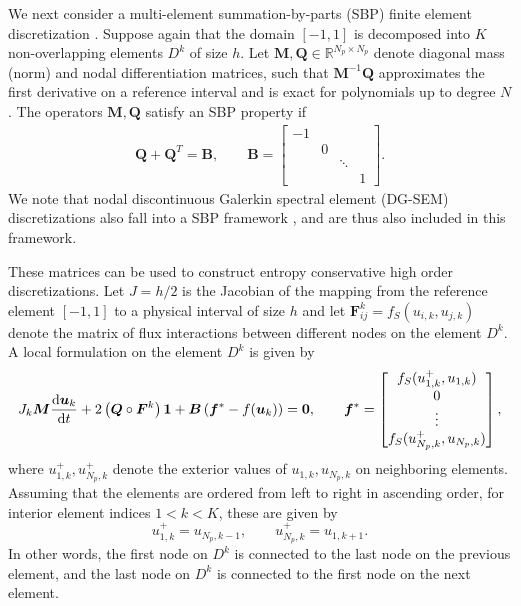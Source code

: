 \documentclass{article}
\newcommand{\td}[2]{\frac{{\rm d}#1}{{\rm d}{ {#2}}}}
\newcommand{\LRp}[1]{\left( #1 \right)}
\newcommand{\eqlab}[1]{\begin{align}#1\end{align}}
\newcommand{\bmat}[1]{\begin{bmatrix}#1\end{bmatrix}}
\begin{document}
We next consider a multi-element summation-by-parts (SBP) finite element discretization \cite{kreiss1974finite, carpenter1999stable}.  Suppose again that the domain $[-1,1]$ is decomposed into $K$ non-overlapping elements $D^k$ of size $h$.  Let ${\bm{M}}, {\bm{Q}} \in \mathbb{R}^{N_p\times N_p}$ denote diagonal mass (norm) and nodal differentiation matrices, such that ${\bm{M}}^{-1}{\bm{Q}}$ approximates the first derivative on a reference interval and is exact for polynomials up to degree $N$.  The operators ${\bm{M}}, {\bm{Q}}$ satisfy an SBP property if
\eqlab{
{\bm{Q}}+{\bm{Q}}^T = {\bm{B}}, \qquad 
{\bm{B}} = \bmat{
-1 & & & \\
& 0 & & \\
& & \ddots & \\
& & & 1 
}.
\label{eq:fvQ}
}
We note that nodal discontinuous Galerkin spectral element (DG-SEM) discretizations \cite{kopriva2009implementing} also fall into a SBP framework \cite{gassner2013skew}, and are thus also included in this framework.  

These matrices can be used to construct entropy conservative high order discretizations.  Let $J = h/2$ is the Jacobian of the mapping from the reference element $[-1,1]$ to a physical interval of size $h$ and let $\bm{F}^k_{ij} = f_S(u_{i,k},u_{j,k})$ denote the matrix of flux interactions between different nodes on the element $D^k$.  A local formulation on the element $D^k$ is given by
\eqlab{
J_k {\bm{M}} \td{\bm{u}_k}{t} + 2\LRp{{\bm{Q}} \circ \bm{F}^k}\bm{1} + \bm{B}\LRp{\bm{f}^*-f(\bm{u}_k)}   = \bm{0}, \qquad \bm{f}^* = \bmat{
f_S(u_{1,k}^+,u_{1,k})\\
0\\
\vdots\\
f_S(u_{N_p,k}^+,u_{N_p,k})
},
\label{eq:sbp1D}
}
where $u_{1,k}^+, u_{N_p,k}^+$ denote the exterior values of $u_{1,k}, u_{N_p,k}$ on neighboring elements.  Assuming that the elements are ordered from left to right in ascending order, for interior element indices $1 < k < K$, these are given by
\[
u_{1,k}^+ = u_{N_p,k-1}, \qquad u_{N_p,k}^+ = u_{1,k+1}.
\]
In other words, the first node on $D^k$ is connected to the last node on the previous element, and the last node on $D^k$ is connected to the first node on the next element.
\end{document}
